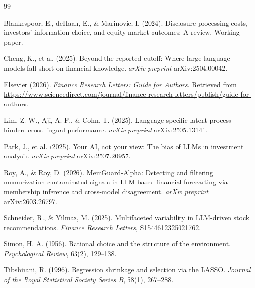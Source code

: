 \documentclass[11pt,letterpaper]{article}
\begin{document}
\begin{thebibliography}{99}\setlength{\itemsep}{4pt}

Blankespoor, E., deHaan, E., \& Marinovic, I. (2024). Disclosure processing costs, investors' information choice, and equity market outcomes: A review. Working paper.

Cheng, K., et al. (2025). Beyond the reported cutoff: Where large language models fall short on financial knowledge. \textit{arXiv preprint} arXiv:2504.00042.

Elsevier (2026). \textit{Finance Research Letters: Guide for Authors}. Retrieved from \url{https://www.sciencedirect.com/journal/finance-research-letters/publish/guide-for-authors}.

Lim, Z. W., Aji, A. F., \& Cohn, T. (2025). Language-specific latent process hinders cross-lingual performance. \textit{arXiv preprint} arXiv:2505.13141.

Park, J., et al. (2025). Your AI, not your view: The bias of LLMs in investment analysis. \textit{arXiv preprint} arXiv:2507.20957.

Roy, A., \& Roy, D. (2026). MemGuard-Alpha: Detecting and filtering memorization-contaminated signals in LLM-based financial forecasting via membership inference and cross-model disagreement. \textit{arXiv preprint} arXiv:2603.26797.

Schneider, R., \& Yilmaz, M. (2025). Multifaceted variability in LLM-driven stock recommendations. \textit{Finance Research Letters}, S1544612325021762.

Simon, H. A. (1956). Rational choice and the structure of the environment. \textit{Psychological Review}, 63(2), 129--138.

Tibshirani, R. (1996). Regression shrinkage and selection via the LASSO. \textit{Journal of the Royal Statistical Society Series B}, 58(1), 267--288.

\end{thebibliography}
\end{document}
